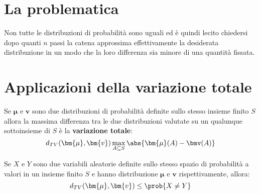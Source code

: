 \documentclass[\main/main.tex]{subfiles}
\begin{document}
\section{La problematica}
Non tutte le distribuzioni di probabilità sono uguali ed è quindi lecito chiedersi dopo quanti \(n\) passi la catena approssima effettivamente la desiderata distribuzione in un modo che la loro differenza sia minore di una quantità fissata.

\section{Applicazioni della variazione totale}
\begin{theorem}
  Se \(\bm{\mu} \) e \(\bm{v}\) sono due distribuzioni di probabilità definite sullo stesso insieme finito \(S\) allora la massima differenza tra le due distribuzioni valutate su un qualunque sottoinsieme di \(S\) è la \textbf{variazione totale}:
  \[
    d_{TV}(\bm{\mu}, \bm{v}) \max_{A \subseteq S}\abs{\bm{\mu}(A) - \bmv(A)}
  \]
\end{theorem}

\begin{theorem}
  Se \(X\) e \(Y\) sono due variabili aleatorie definite sullo stesso spazio di probabilità a valori in un insieme finito \(S\) e hanno distribuzione \(\bm{\mu} \) e \(\bm{v}\) rispettivamente, allora:
  \[
    d_{TV}(\bm{\mu}, \bm{v}) \leq \prob{X \neq Y}
  \]
\end{theorem}
\clearpage
\end{document}
